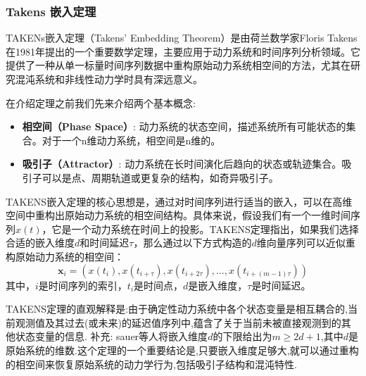 \subsubsection{Takens 嵌入定理}
TAKENs嵌入定理（Takens' Embedding Theorem）\cite{takens2006detecting}是由荷兰数学家Floris Takens在1981年提出的一个重要数学定理，主要应用于动力系统和时间序列分析领域。它提供了一种从单一标量时间序列数据中重构原始动力系统相空间的方法，尤其在研究混沌系统和非线性动力学时具有深远意义。

在介绍定理之前我们先来介绍两个基本概念:
\begin{itemize}
    \item \textbf{相空间（Phase Space）}: 动力系统的状态空间，描述系统所有可能状态的集合。对于一个n维动力系统，相空间是n维的。
    \item \textbf{吸引子（Attractor）}: 动力系统在长时间演化后趋向的状态或轨迹集合。吸引子可以是点、周期轨道或更复杂的结构，如奇异吸引子。
\end{itemize}
TAKENS嵌入定理的核心思想是，通过对时间序列进行适当的嵌入，可以在高维空间中重构出原始动力系统的相空间结构。具体来说，假设我们有一个一维时间序列$x(t)$，它是一个动力系统在时间上的投影。TAKENS定理指出，如果我们选择合适的嵌入维度$d$和时间延迟$\tau$，那么通过以下方式构造的$d$维向量序列可以近似重构原始动力系统的相空间：
\begin{equation}
    \mathbf{x}_i = (x(t_i), x(t_{i+\tau}), x(t_{i+2\tau}), \ldots, x(t_{i+(m-1)\tau}))
\end{equation}
其中，$i$是时间序列的索引，$t_i$是时间点，$d$是嵌入维度，$\tau$是时间延迟。

TAKENS定理的直观解释是:由于确定性动力系统中各个状态变量是相互耦合的,当前观测值及其过去(或未来)的延迟值序列中,蕴含了关于当前未被直接观测到的其他状态变量的信息.
补充: sauer等人将嵌入维度$d$的下限给出为$m\geq 2d+1$,其中$d$是原始系统的维数.这个定理的一个重要结论是,只要嵌入维度足够大,就可以通过重构的相空间来恢复原始系统的动力学行为,包括吸引子结构和混沌特性.



